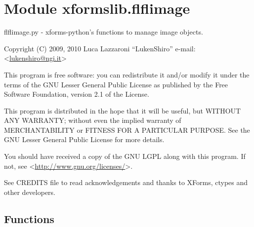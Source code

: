 %
%
%


\section{Module xformslib.flflimage}

    \label{xformslib:flflimage}

flflimage.py - xforms-python's functions to manage image objects.

Copyright (C) 2009, 2010  Luca Lazzaroni ``LukenShiro''
e-mail: <\href{mailto:lukenshiro@ngi.it}{lukenshiro@ngi.it}>

This program is free software: you can redistribute it and/or modify
it under the terms of the GNU Lesser General Public License as
published by the Free Software Foundation, version 2.1 of the License.

This program is distributed in the hope that it will be useful,
but WITHOUT ANY WARRANTY; without even the implied warranty of
MERCHANTABILITY or FITNESS FOR A PARTICULAR PURPOSE. See the
GNU Lesser General Public License for more details.

You should have received a copy of the GNU LGPL along with this
program. If not, see <\href{http://www.gnu.org/licenses/}{http://www.gnu.org/licenses/}>.

See CREDITS file to read acknowledgements and thanks to XForms,
ctypes and other developers.


  \subsection{Functions}

    \label{xformslib:flflimage:FL_RGB2GRAY}

